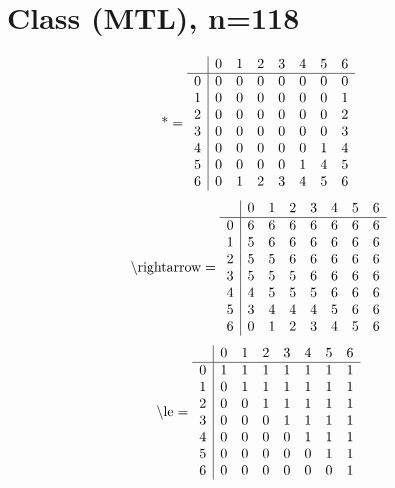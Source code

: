 \documentclass[11pt]{article}
\begin{document}
\section{Class (MTL), n=118}
\[\text{*} = 
\begin{array}{r | r r r r r r r}
 & 0 & 1 & 2 & 3 & 4 & 5 & 6 \\ \hline
0 & 0 & 0 & 0 & 0 & 0 & 0 & 0 \\
1 & 0 & 0 & 0 & 0 & 0 & 0 & 1 \\
2 & 0 & 0 & 0 & 0 & 0 & 0 & 2 \\
3 & 0 & 0 & 0 & 0 & 0 & 0 & 3 \\
4 & 0 & 0 & 0 & 0 & 0 & 1 & 4 \\
5 & 0 & 0 & 0 & 0 & 1 & 4 & 5 \\
6 & 0 & 1 & 2 & 3 & 4 & 5 & 6 \\
\end{array}
\]
\[\text{\textbackslash rightarrow} = 
\begin{array}{r | r r r r r r r}
 & 0 & 1 & 2 & 3 & 4 & 5 & 6 \\ \hline
0 & 6 & 6 & 6 & 6 & 6 & 6 & 6 \\
1 & 5 & 6 & 6 & 6 & 6 & 6 & 6 \\
2 & 5 & 5 & 6 & 6 & 6 & 6 & 6 \\
3 & 5 & 5 & 5 & 6 & 6 & 6 & 6 \\
4 & 4 & 5 & 5 & 5 & 6 & 6 & 6 \\
5 & 3 & 4 & 4 & 4 & 5 & 6 & 6 \\
6 & 0 & 1 & 2 & 3 & 4 & 5 & 6 \\
\end{array}
\]
\[\text{\textbackslash le} = 
\begin{array}{r | r r r r r r r}
 & 0 & 1 & 2 & 3 & 4 & 5 & 6 \\ \hline
0 & 1 & 1 & 1 & 1 & 1 & 1 & 1 \\
1 & 0 & 1 & 1 & 1 & 1 & 1 & 1 \\
2 & 0 & 0 & 1 & 1 & 1 & 1 & 1 \\
3 & 0 & 0 & 0 & 1 & 1 & 1 & 1 \\
4 & 0 & 0 & 0 & 0 & 1 & 1 & 1 \\
5 & 0 & 0 & 0 & 0 & 0 & 1 & 1 \\
6 & 0 & 0 & 0 & 0 & 0 & 0 & 1 \\
\end{array}
\]
\end{document}
